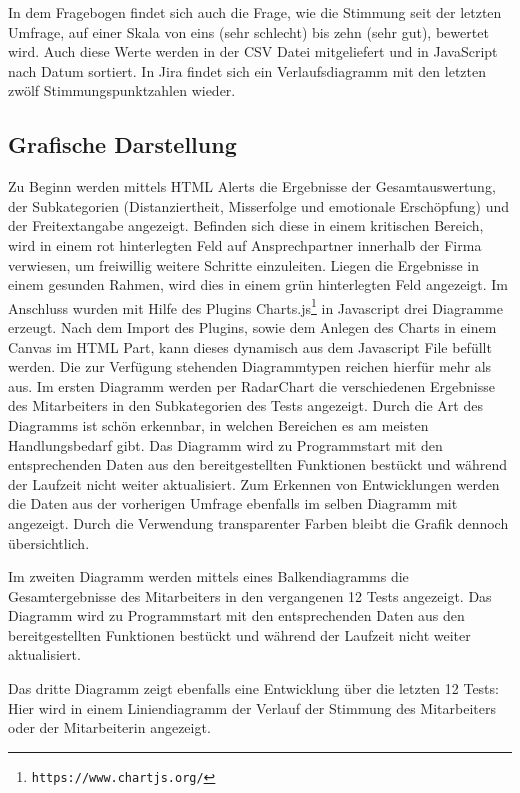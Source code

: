 \documentclass[a4paper,12pt,]{article}
\begin{document}
In dem Fragebogen findet sich auch die Frage, wie die Stimmung seit der letzten Umfrage, auf einer Skala von eins (sehr schlecht) bis zehn (sehr gut), bewertet wird. Auch diese Werte werden in der CSV Datei mitgeliefert und in JavaScript nach Datum sortiert. In Jira findet sich ein Verlaufsdiagramm mit den letzten zwölf Stimmungspunktzahlen wieder. 


\subsection{Grafische Darstellung}
Zu Beginn werden mittels HTML Alerts die Ergebnisse der Gesamtauswertung, der Subkategorien (Distanziertheit, Misserfolge und emotionale Erschöpfung) und der Freitextangabe angezeigt. Befinden sich diese in einem kritischen Bereich, wird in einem rot hinterlegten Feld auf Ansprechpartner innerhalb der Firma verwiesen, um freiwillig weitere Schritte einzuleiten. Liegen die Ergebnisse in einem gesunden Rahmen, wird dies in einem grün hinterlegten Feld angezeigt.
Im Anschluss wurden mit Hilfe des Plugins Charts.js\footnote{\tt  https://www.chartjs.org/} in Javascript drei Diagramme erzeugt.
Nach dem Import des Plugins, sowie dem Anlegen des Charts in einem Canvas im HTML Part, kann dieses dynamisch aus dem Javascript File befüllt werden. Die zur Verfügung stehenden Diagrammtypen reichen hierfür mehr als aus.
Im ersten Diagramm werden per RadarChart die verschiedenen Ergebnisse des Mitarbeiters in den Subkategorien des Tests angezeigt. Durch die Art des Diagramms ist schön erkennbar, in welchen Bereichen es am meisten Handlungsbedarf gibt. Das Diagramm wird zu Programmstart mit den entsprechenden Daten aus den bereitgestellten Funktionen bestückt und während der Laufzeit nicht weiter aktualisiert. Zum Erkennen von Entwicklungen werden die Daten aus der vorherigen Umfrage ebenfalls im selben Diagramm mit angezeigt. Durch die Verwendung transparenter Farben bleibt die Grafik dennoch übersichtlich.

Im zweiten Diagramm werden mittels eines Balkendiagramms die Gesamtergebnisse des Mitarbeiters in den vergangenen 12 Tests angezeigt. Das Diagramm wird zu Programmstart mit den entsprechenden Daten aus den bereitgestellten Funktionen bestückt und während der Laufzeit nicht weiter aktualisiert.

Das dritte Diagramm zeigt ebenfalls eine Entwicklung über die letzten 12 Tests: Hier wird in einem Liniendiagramm der Verlauf der Stimmung des Mitarbeiters oder der Mitarbeiterin angezeigt.
\end{document}
